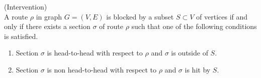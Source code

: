 \begin{defi} (Intervention) \\
	A route $\rho$ in graph $G = (V, E)$ is blocked by a subset $S \subset V$ of vertices if and only if there 				exists a section $\sigma$ of route $\rho$ such that one of the following conditions is satisfied.
	
	\begin{enumerate}
		\item Section $\sigma$ is head-to-head with respect to $\rho$ and $\sigma$ is outside of $S$.
		\item Section $\sigma$ is non head-to-head with respect to $\rho$ and $\sigma$ is hit by $S$.
	\end{enumerate}
	
\end{defi}



